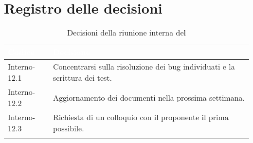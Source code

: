 \section{Registro delle decisioni}
{
\renewcommand{\arraystretch}{1.5}
\centering
\begin{longtable}{C{3cm} C{9cm}}
\textcolor{white}{\textbf{Codice}}&
\textcolor{white}{\textbf{Decisione}}\\	

\endhead
		
Interno-12.1 & Concentrarsi sulla risoluzione dei bug individuati e la scrittura dei test. \\
Interno-12.2 & Aggiornamento dei documenti nella prossima settimana.\\
Interno-12.3 & Richiesta di un colloquio con il proponente il prima possibile.\\

\caption{Decisioni della riunione interna del \Data{}}
\end{longtable}
}

